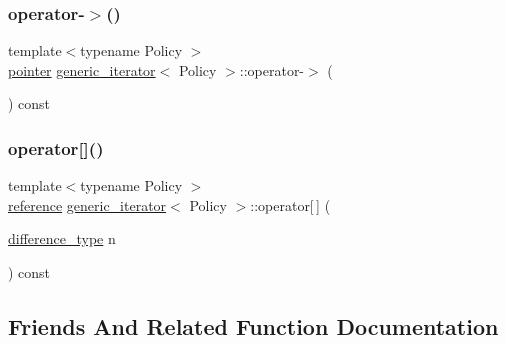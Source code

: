 \subsubsection{\texorpdfstring{operator-\/$>$()}{operator->()}}
{\footnotesize\ttfamily template$<$typename Policy $>$ \\
\mbox{\hyperlink{classgeneric__iterator_ab1e9fe365dec39e05180fb7e1c153f2e}{pointer}} \mbox{\hyperlink{classgeneric__iterator}{generic\+\_\+iterator}}$<$ Policy $>$\+::operator-\/$>$ (\begin{DoxyParamCaption}{ }\end{DoxyParamCaption}) const\hspace{0.3cm}{\ttfamily [inline]}}

\mbox{\label{classgeneric__iterator_aa0918f810b09d39e43ab8df9f3661379}} 
\subsubsection{\texorpdfstring{operator[]()}{operator[]()}}
{\footnotesize\ttfamily template$<$typename Policy $>$ \\
\mbox{\hyperlink{classgeneric__iterator_aed22b28672b10453f89e239e55277808}{reference}} \mbox{\hyperlink{classgeneric__iterator}{generic\+\_\+iterator}}$<$ Policy $>$\+::operator\mbox{[}$\,$\mbox{]} (\begin{DoxyParamCaption}\item[{\mbox{\hyperlink{classgeneric__iterator_a307cd6eddc16127eb873d76bcfc07233}{difference\+\_\+type}}}]{n }\end{DoxyParamCaption}) const\hspace{0.3cm}{\ttfamily [inline]}}



\subsection{Friends And Related Function Documentation}
\mbox{\label{classgeneric__iterator_a00afb6c7a0f23ae65ef61656fa48dbc3}} 
